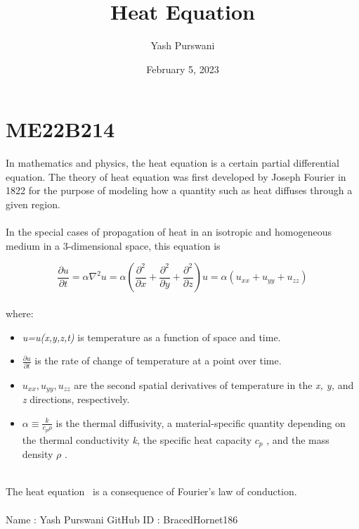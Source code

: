 \documentclass[12pt,a4paper]{article}
\author{Yash Purswani}
\title{Heat Equation}
\date{February 5, 2023}
\begin{document}
\maketitle

\section{ME22B214}

In mathematics and physics, the heat equation is a certain partial differential equation. The theory of heat equation was first developed by Joseph Fourier in 1822 for the purpose of modeling how a quantity such as heat diffuses through a given region.
\\ \\
In the special cases of propagation of heat in an isotropic and homogeneous medium in a 3-dimensional space, this equation is

\begin{equation}
    \frac{\partial u}{\partial t} = \alpha\nabla^2u = \alpha \left(\frac{\partial^2}{\partial x}+\frac{\partial^2}{\partial y}+\frac{\partial^2}{\partial z}\right)u = \alpha(u_{xx}+u_{yy}+u_{zz})
    \label {eqn:heat}
\end{equation}
\\
where:
\begin{itemize}
    \item \emph{u=u(x,y,z,t)} is temperature as a function of space and time. 
    \item $\frac{\partial u}{\partial t}$ is the rate of change of temperature at a point over time.
    \item $u_{xx},u_{yy},u_{zz}$ are the second spatial derivatives of temperature in the \emph{x, y,} and \emph{z} directions, respectively.
    \item $\alpha \equiv \frac{k}{c_p\rho}$ is the thermal diffusivity, a material-specific quantity depending on the thermal conductivity \emph{k}, the specific heat capacity $c_p$ , and the mass density $\rho$ .
\end{itemize}
\\
The heat equation~\cite{heat_equation} is a consequence of Fourier's law of conduction.\\
\\
Name : Yash Purswani
GitHub ID : BracedHornet186


\end{document}
